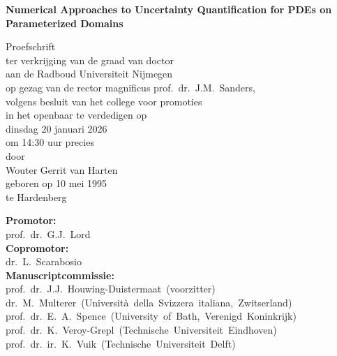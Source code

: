 
\thispagestyle{empty}
\begin{center}
\vspace*{1cm}
\huge
\textbf{Numerical Approaches to Uncertainty Quantification for PDEs on Parameterized Domains}

\vfill

\Large
Proefschrift\\
\bigskip
\normalsize
ter verkrijging van de graad van doctor\\
aan de Radboud Universiteit Nijmegen\\
op gezag van de rector magnificus prof.~dr.~J.M.~Sanders,\\
volgens besluit van het college voor promoties\\
in het openbaar te verdedigen op\\
\vspace{\baselineskip}
dinsdag 20 januari 2026\\
om 14:30 uur precies\\
\vspace{\baselineskip}
door\\
\medskip
\Large
Wouter Gerrit van Harten\\
\vspace{\baselineskip}
\normalsize
geboren op 10 mei 1995\\
te Hardenberg

\end{center}
\newpage

\begingroup
    \fontsize{10pt}{12pt}\selectfont
    \thispagestyle{empty}
    \noindent
    \textbf{Promotor:}\\
    prof.~dr.~G.J.~Lord
    \medskip\\
    \textbf{Copromotor:}\\
    dr.~L.~Scarabosio
    \medskip\\
    \textbf{Manuscriptcommissie:}\\
    prof.~dr.~J.J.~Houwing-Duistermaat~(voorzitter)\\
    dr.~M.~Multerer~(Università~della~Svizzera~italiana,~Zwitserland)\\
    prof.~dr.~E.~A.~Spence~(University~of~Bath,~Verenigd~Koninkrijk)\\
    prof.~dr.~K.~Veroy-Grepl~(Technische~Universiteit~Eindhoven)\\
    prof.~dr.~ir.~K.~Vuik~(Technische~Universiteit~Delft)\\

\endgroup
\newpage

